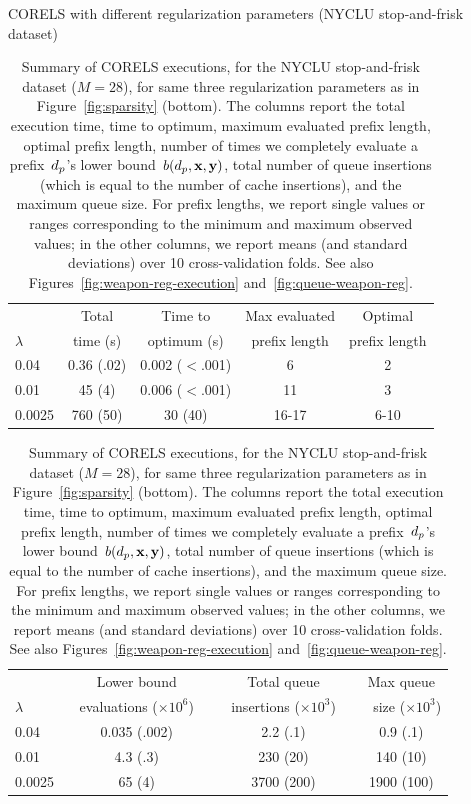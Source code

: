 \begin{table}[t!]
\centering
CORELS with different regularization parameters (NYCLU stop-and-frisk dataset) \\
\vspace{2mm}
\begin{tabular}{l | c | c | c | c}
& Total & Time to & Max evaluated & Optimal \\
$\lambda$ & time (s) & optimum (s) & prefix length & prefix length \\
\hline
0.04 & 0.36 (.02) & 0.002 ($<$.001) & 6 & 2 \\
0.01 & 45 (4) & 0.006 ($<$.001) & 11 & 3 \\
0.0025 & 760 (50) & 30 (40) & 16-17 & 6-10 \\
\hline
\end{tabular}
\begin{tabular}{l | c | c | c}
\hline
& Lower bound & Total queue &  Max queue \\
$\lambda$ ~&~ evaluations ($\times 10^6$) ~&~ insertions ($\times 10^3$) ~&~ size ($\times 10^3$) \\
\hline
0.04 & 0.035 (.002) & 2.2 (.1) & 0.9 (.1) \\
0.01 & 4.3 (.3) & 230 (20) & 140 (10) \\
0.0025 & 65 (4) & 3700 (200) & 1900 (100) \\
\end{tabular}
\caption{Summary of CORELS executions, for the NYCLU stop-and-frisk dataset (${M = 28}$),
for same three regularization parameters as in Figure~\ref{fig:sparsity} (bottom).
%
The columns report the total execution time,
time to optimum, maximum evaluated prefix length, optimal prefix length,
number of times we completely evaluate a prefix~$d_p$'s lower bound~$b(d_p, \mathbf{x}, \mathbf{y})$,
total number of queue insertions (which is equal to the number of cache insertions),
and the maximum queue size.
%
For prefix lengths, we report single values or ranges corresponding to the minimum and maximum observed values;
in the other columns, we report means (and standard deviations) over 10 cross-validation folds.
%
See also Figures~\ref{fig:weapon-reg-execution} and~\ref{fig:queue-weapon-reg}.
}
\vspace{4mm}
\label{tab:weapon-reg}
\end{table}

